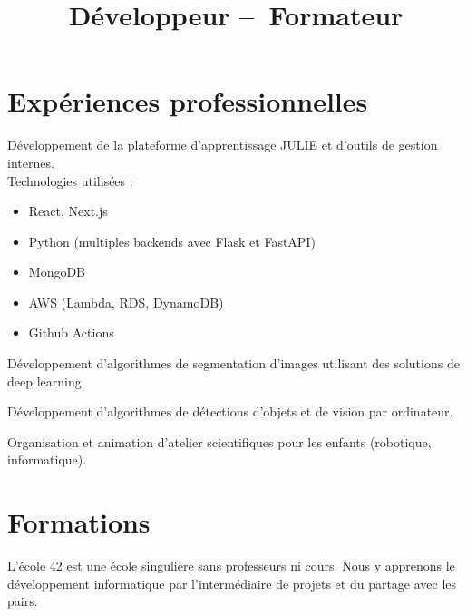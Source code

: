 \documentclass[10pt,a4paper,sans]{moderncv}
\title{Développeur – Formateur}
\begin{document}
\makecvtitle

\section{Expériences professionnelles}
    {
        Développement de la plateforme d'apprentissage JULIE et d'outils de gestion internes.\\
        Technologies utilisées :
        {\setlength\multicolsep{0pt}
        \begin{multicols}{2}
            \begin{itemize}
                \item React, Next.js
                \item Python (multiples backends avec Flask et FastAPI)
                \item MongoDB
                \item AWS (Lambda, RDS, DynamoDB)
                \item Github Actions
            \end{itemize}
        \end{multicols}}
    }


        {Développement d'algorithmes de segmentation d'images utilisant des solutions de deep learning.}

        {Développement d'algorithmes de détections d'objets et de vision par ordinateur.}

        {Organisation et animation d'atelier scientifiques pour les enfants (robotique, informatique).}

\section{Formations}
        {}
        {}
        {
            L'école 42 est une école singulière sans professeurs ni cours. Nous y
            apprenons le développement informatique par l'intermédiaire de projets et du
            partage avec les pairs.
        }
\end{document}
